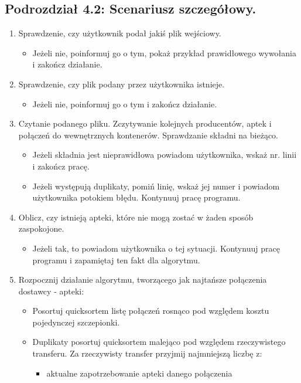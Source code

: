 \documentclass[a4paper]{article}
\begin{document}
\subsection*{Podrozdział 4.2: Scenariusz szczegółowy.}
\begin{enumerate}
\item Sprawdzenie, czy użytkownik podał jakiś plik wejściowy.
	\begin{itemize}
		\item Jeżeli nie, poinformuj go o tym, pokaż przykład prawidłowego wywołania i zakończ działanie.
	\end{itemize}
\item Sprawdzenie, czy plik podany przez użytkownika istnieje. 
	\begin{itemize}
		\item Jeżeli nie, poinformuj go o tym i zakończ działanie.
	\end{itemize}
\item Czytanie podanego pliku. Zczytywanie kolejnych producentów, aptek i połączeń do wewnętrznych kontenerów. Sprawdzanie składni na bieżąco. 
	\begin{itemize}
		\item Jeżeli składnia jest nieprawidłowa powiadom użytkownika, wskaż nr. linii i zakończ pracę.
		\item Jeżeli występują duplikaty, pomiń linię, wskaż jej numer i powiadom użytkownika potokiem błędu. Kontynuuj pracę programu.
	\end{itemize}
\item Oblicz, czy istnieją apteki, które nie mogą zostać w żaden sposób zaspokojone. 
	\begin{itemize}
		\item Jeżeli tak, to powiadom użytkownika o tej sytuacji. Kontynuuj pracę programu i zapamiętaj ten fakt dla algorytmu.
	\end{itemize}
\item Rozpocznij działanie algorytmu, tworzącego jak najtańsze połączenia dostawcy - apteki:
	\begin{itemize}
		\item Posortuj quicksortem listę połączeń rosnąco pod względem kosztu pojedynczej szczepionki.
		\item Duplikaty posortuj quicksortem malejąco pod względem rzeczywistego transferu. Za rzeczywisty transfer przyjmij najmniejszą liczbę z: 
		\begin{itemize}
				\item aktualne zapotrzebowanie apteki danego połączenia

\end{itemize}
\end{itemize}
\end{enumerate}
\end{document}
